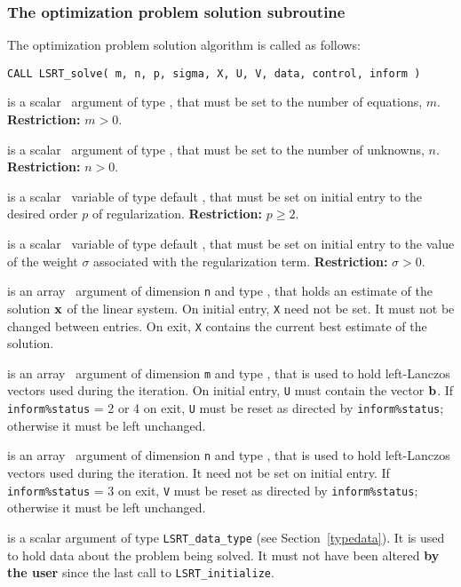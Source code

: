 \documentclass{galahad}
\newcommand{\packagename}{LS\-RT}
\begin{document}

\subsubsection{The optimization problem solution subroutine}
The optimization problem solution algorithm is called as follows:

\hskip0.5in
{\tt CALL \packagename\_solve( m, n, p, sigma, X, U, V, data, control, inform )}

\begin{description}

 is a scalar \intentin\ argument of type \integer, that must be
set to the number of equations, $m$. {\bf Restriction: } $m > 0$.

 is a scalar \intentin\ argument of type \integer, that must be
set to the number of unknowns, $n$. {\bf Restriction: } $n > 0$.

 is a scalar \intentin\ variable of type default
\realdp,
that must be set on initial entry to the desired order $p$ of regularization.
{\bf Restriction: } $p \geq 2$.

 is a scalar \intentin\ variable of type default
\realdp,
that must be set on initial entry
to the value of the weight $\sigma$ associated with the regularization term.
{\bf Restriction: } $\sigma > 0$.

 is an array \intentinout\ argument of dimension {\tt n} and
type \realdp,
that holds an estimate of the solution ${\mathbf{x}}$ of the linear system.
On initial entry, {\tt X} need not be set.
It must not be changed between entries.
On exit, {\tt X} contains the current best estimate of the solution.

 is an array \intentinout\ argument of dimension {\tt m} and
type \realdp,
that is used to hold left-Lanczos vectors used during the iteration.
On initial entry, {\tt U} must contain the vector ${\mathbf{b}}$.
If {\tt inform\%status} = 2 or 4 on exit, {\tt U} must be reset
as directed by  {\tt inform\%status}; otherwise
it must be left unchanged.

 is an array \intentinout\ argument of dimension {\tt n} and
type \realdp,
that is used to hold left-Lanczos vectors used during the iteration.
It need not be set on initial entry.
If {\tt inform\%status} = 3 on exit, {\tt V} must be reset
as directed by  {\tt inform\%status}; otherwise it must be left unchanged.

 is a scalar \intentinout argument of type
{\tt \packagename\_data\_type}
(see Section~\ref{typedata}). It is used to hold data about the problem being
solved. It must not have been altered {\bf by the user} since the last call to
{\tt \packagename\_initialize}.


\end{description}
\end{document}

